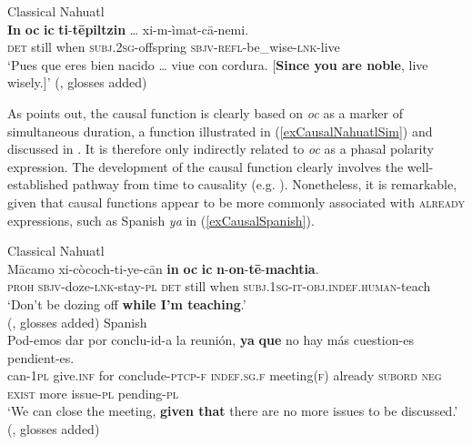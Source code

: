 \begin{exe}
	\ex Classical Nahuatl\label{exCausalNahuatl}\\
	\gll \textbf{In} \textbf{oc} \textbf{ic} \textbf{ti}-\textbf{tēpiltzin} … xi-m-ìmat-cā-nemi.\\
	\textsc{det} still when \textsc{subj}.2\textsc{sg}-offspring {} \textsc{sbjv}-\textsc{refl}-be\_wise-\textsc{lnk}-live\\
	\glt \lq Pues que eres bien nacido … viue con cordura. [\textbf{Since you are noble}, live wisely.]' (\cite[503]{Carochi1645}, glosses added)
\end{exe}

As \textcite[1269]{Launey1986} points out, the causal function is clearly based on \textit{oc} as a marker of simultaneous duration, a function illustrated in (\ref{exCausalNahuatlSim}) and discussed in . It is therefore only indirectly related to \textit{oc} as a phasal polarity expression. The development of the causal function clearly involves the well-established pathway from time to causality (e.g. \cite[425]{KutevaEtAl2019}). Nonetheless, it is remarkable, given that causal functions appear to be more commonly associated with \textsc{already} expressions, such as Spanish \textit{ya} in (\ref{exCausalSpanish}).
\begin{exe}
	\ex Classical Nahuatl\label{exCausalNahuatlSim}\\
	\gll Mācamo xi-còcoch-ti-ye-cān \textbf{in} \textbf{oc} \textbf{ic} \textbf{n}-\textbf{on}-\textbf{tē}-\textbf{machtia}.\\
	\textsc{proh} \textsc{sbjv}-doze-\textsc{lnk}-stay-\textsc{pl} \textsc{det} still when \textsc{subj}.1\textsc{sg}-\textsc{it}-\textsc{obj}.\textsc{indef}.\textsc{human}-teach\\
	\glt \lq Don’t be dozing off \textbf{while I’m teaching}.'
	\\(\cite[366]{LauneyMackay2011}, glosses added)
	\pagebreak
	\ex Spanish\label{exCausalSpanish}\\
	\gll Pod-emos dar por conclu-id-a la reunión, \textbf{ya} \textbf{que} no hay más cuestion-es pendient-es.\\
	can-1\textsc{pl} give.\textsc{inf} for conclude-\textsc{ptcp}-\textsc{f} \textsc{indef}.\textsc{sg}.\textsc{f} meeting(\textsc{f}) already \textsc{subord} \textsc{neg} \textsc{exist} more issue-\textsc{pl} pending-\textsc{pl}\\
	\glt \lq{}We can close the meeting, \textbf{given that} there are no more issues to be discussed.\rq{ }(\cite[§46.3a]{RAEGramatica}, glosses added)
\end{exe}

